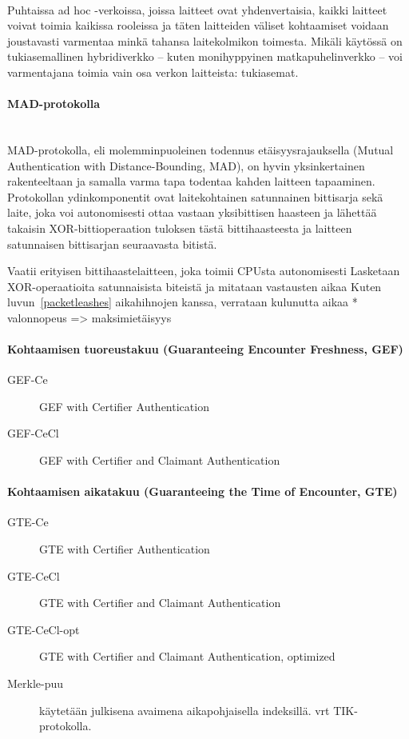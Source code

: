 \documentclass[finnish]{tktltiki2}
\theoremstyle{definition}
\theoremstyle{remark}
\begin{document}
\noindent\\
Puhtaissa ad hoc -verkoissa, joissa laitteet ovat yhdenvertaisia, kaikki laitteet voivat toimia kaikissa rooleissa ja täten laitteiden väliset kohtaamiset voidaan joustavasti varmentaa minkä tahansa laitekolmikon toimesta. Mikäli käytössä on tukiasemallinen hybridiverkko -- kuten monihyppyinen matkapuhelinverkko -- voi varmentajana toimia vain osa verkon laitteista: tukiasemat.

\paragraph{MAD-protokolla}
\noindent\\
MAD-protokolla, eli molemminpuoleinen todennus etäisyysrajauksella (Mutual Authentication with Distance-Bounding, MAD), on hyvin yksinkertainen rakenteeltaan ja samalla varma tapa todentaa kahden laitteen tapaaminen. Protokollan ydinkomponentit ovat laitekohtainen satunnainen bittisarja sekä laite, joka voi autonomisesti ottaa vastaan yksibittisen haasteen ja lähettää takaisin XOR-bittioperaation tuloksen tästä bittihaasteesta ja laitteen satunnaisen bittisarjan seuraavasta bitistä.


Vaatii erityisen bittihaastelaitteen, joka toimii CPUsta autonomisesti
Lasketaan XOR-operaatioita satunnaisista biteistä ja mitataan vastausten aikaa
Kuten luvun~\ref{packetleashes} aikahihnojen kanssa, verrataan kulunutta aikaa * valonnopeus => maksimietäisyys

\paragraph{Kohtaamisen tuoreustakuu (Guaranteeing Encounter Freshness, GEF)}

\begin{description}
\item[GEF-Ce] GEF with Certifier Authentication
\item[GEF-CeCl] GEF with Certifier and Claimant Authentication
\end{description}

\paragraph{Kohtaamisen aikatakuu (Guaranteeing the Time of Encounter, GTE)}

\begin{description}
\item[GTE-Ce] GTE with Certifier Authentication
\item[GTE-CeCl] GTE with Certifier and Claimant Authentication
\item[GTE-CeCl-opt] GTE with Certifier and Claimant Authentication, optimized
\item[Merkle-puu] käytetään julkisena avaimena aikapohjaisella indeksillä. vrt TIK-protokolla.
\end{description}
\end{document}
